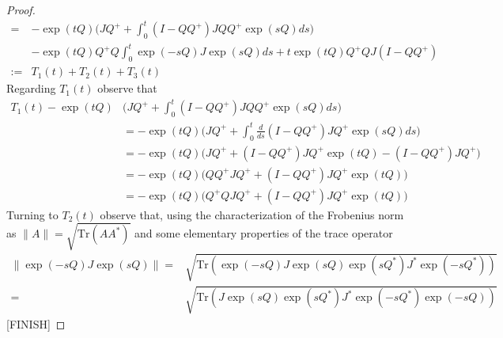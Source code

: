 \documentclass[twoside]{article}
\numberwithin{equation}{section}
\newcommand{\tr}{\mbox{Tr}}
\begin{document}
\begin{proof}
\begin{align*}
	       =& -\exp(tQ)\biggl(J Q^+ +  \int_0^t (I - Q Q^+ )J QQ^+ \exp(s Q) ds\biggr)\\
	          & - \exp(tQ) Q^+ Q\int_0^t \exp(-sQ)   J \exp(s Q)ds +t \exp(tQ) Q^+ Q J( I - QQ^+) \\
	        :=& T_1(t) + T_2(t) + T_3(t)
\end{align*}
Regarding $T_1(t)$ observe that
\begin{align*}
T_1(t)-\exp(tQ)&\biggl(J Q^+ +  \int_0^t (I - Q Q^+ )J QQ^+ \exp(s Q) ds\biggr) \\
&= -\exp(tQ)\biggl(J Q^+ +  \int_0^t \frac{d}{ds}(I - Q Q^+ )J Q^+ \exp(s Q) ds\biggr)\\
&= -\exp(tQ)\biggl(J Q^+ + (I - Q Q^+ )J Q^+\exp(tQ) - (I - Q Q^+ )J Q^+)\\
&= -\exp(tQ)\biggl(Q Q^+J Q^+ + (I - Q Q^+ )J Q^+\exp(tQ) \biggr)\\
&=  -\exp(tQ)\biggl(Q^+Q J Q^+ + (I - Q Q^+ )J Q^+\exp(tQ) \biggr)
\end{align*}
Turning to $T_2(t)$ observe that, using the characterization of the Frobenius norm
as $\| A\| = \sqrt{\tr(AA^*)}$ and some elementary properties of the trace operator
\begin{align*}
   \| \exp(-sQ)   J \exp(s Q)\| 
   =& \sqrt{\tr( \exp(-sQ)   J \exp(s Q) \exp(sQ^*)   J^* \exp(-s Q^*) )}\\
      =&\sqrt{\tr(    J \exp(s Q) \exp(sQ^*)  J^* \exp(-s Q^*) \exp(-sQ) )}
\end{align*}
[FINISH]
\end{proof}
\end{document}
